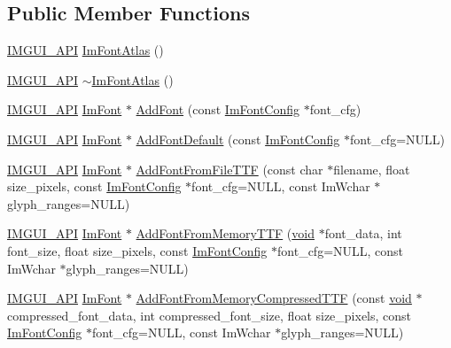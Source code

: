 \subsection*{Public Member Functions}
\begin{DoxyCompactItemize}
\item 
\hyperlink{imgui_8h_a43829975e84e45d1149597467a14bbf5}{I\+M\+G\+U\+I\+\_\+\+A\+PI} \hyperlink{structImFontAtlas_aa34e7909d30440d5c35aaef990ac741e}{Im\+Font\+Atlas} ()
\item 
\hyperlink{imgui_8h_a43829975e84e45d1149597467a14bbf5}{I\+M\+G\+U\+I\+\_\+\+A\+PI} \hyperlink{structImFontAtlas_a950b4f7586ad7786ae251b957d67a268}{$\sim$\+Im\+Font\+Atlas} ()
\item 
\hyperlink{imgui_8h_a43829975e84e45d1149597467a14bbf5}{I\+M\+G\+U\+I\+\_\+\+A\+PI} \hyperlink{structImFont}{Im\+Font} $\ast$ \hyperlink{structImFontAtlas_ad01c0f19a95d37a9e5ebab1e54525625}{Add\+Font} (const \hyperlink{structImFontConfig}{Im\+Font\+Config} $\ast$font\+\_\+cfg)
\item 
\hyperlink{imgui_8h_a43829975e84e45d1149597467a14bbf5}{I\+M\+G\+U\+I\+\_\+\+A\+PI} \hyperlink{structImFont}{Im\+Font} $\ast$ \hyperlink{structImFontAtlas_a9d2b4a94579bf603a0d2662cd8348cbd}{Add\+Font\+Default} (const \hyperlink{structImFontConfig}{Im\+Font\+Config} $\ast$font\+\_\+cfg=N\+U\+LL)
\item 
\hyperlink{imgui_8h_a43829975e84e45d1149597467a14bbf5}{I\+M\+G\+U\+I\+\_\+\+A\+PI} \hyperlink{structImFont}{Im\+Font} $\ast$ \hyperlink{structImFontAtlas_a26d0333bae95222ca2c2fd2886eae562}{Add\+Font\+From\+File\+T\+TF} (const char $\ast$filename, float size\+\_\+pixels, const \hyperlink{structImFontConfig}{Im\+Font\+Config} $\ast$font\+\_\+cfg=N\+U\+LL, const Im\+Wchar $\ast$glyph\+\_\+ranges=N\+U\+LL)
\item 
\hyperlink{imgui_8h_a43829975e84e45d1149597467a14bbf5}{I\+M\+G\+U\+I\+\_\+\+A\+PI} \hyperlink{structImFont}{Im\+Font} $\ast$ \hyperlink{structImFontAtlas_adb01397920998a18e25bd8fed3f791a7}{Add\+Font\+From\+Memory\+T\+TF} (\hyperlink{imgui__impl__opengl3__loader_8h_ac668e7cffd9e2e9cfee428b9b2f34fa7}{void} $\ast$font\+\_\+data, int font\+\_\+size, float size\+\_\+pixels, const \hyperlink{structImFontConfig}{Im\+Font\+Config} $\ast$font\+\_\+cfg=N\+U\+LL, const Im\+Wchar $\ast$glyph\+\_\+ranges=N\+U\+LL)
\item 
\hyperlink{imgui_8h_a43829975e84e45d1149597467a14bbf5}{I\+M\+G\+U\+I\+\_\+\+A\+PI} \hyperlink{structImFont}{Im\+Font} $\ast$ \hyperlink{structImFontAtlas_a579bb434bd116ea9ac4f892652ccefdb}{Add\+Font\+From\+Memory\+Compressed\+T\+TF} (const \hyperlink{imgui__impl__opengl3__loader_8h_ac668e7cffd9e2e9cfee428b9b2f34fa7}{void} $\ast$compressed\+\_\+font\+\_\+data, int compressed\+\_\+font\+\_\+size, float size\+\_\+pixels, const \hyperlink{structImFontConfig}{Im\+Font\+Config} $\ast$font\+\_\+cfg=N\+U\+LL, const Im\+Wchar $\ast$glyph\+\_\+ranges=N\+U\+LL)

\end{DoxyCompactItemize}

